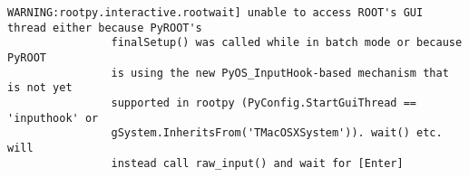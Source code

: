 \begin{footnotesize}
\begin{verbatim}
WARNING:rootpy.interactive.rootwait] unable to access ROOT's GUI thread either because PyROOT's
                finalSetup() was called while in batch mode or because PyROOT
                is using the new PyOS_InputHook-based mechanism that is not yet
                supported in rootpy (PyConfig.StartGuiThread == 'inputhook' or
                gSystem.InheritsFrom('TMacOSXSystem')). wait() etc. will
                instead call raw_input() and wait for [Enter]
\end{verbatim}
\end{footnotesize}
